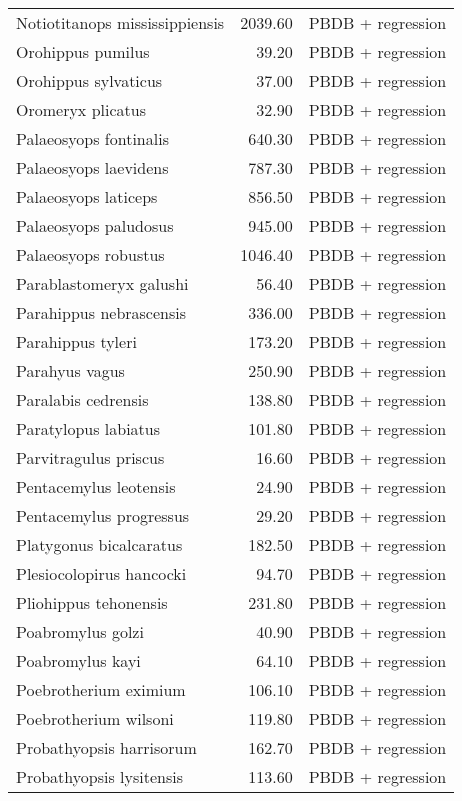 \begin{table}[ht]
\begin{tabular}{lrl}
  Notiotitanops mississippiensis & 2039.60 & PBDB + regression \\ 
  Orohippus pumilus & 39.20 & PBDB + regression \\ 
  Orohippus sylvaticus & 37.00 & PBDB + regression \\ 
  Oromeryx plicatus & 32.90 & PBDB + regression \\ 
  Palaeosyops fontinalis & 640.30 & PBDB + regression \\ 
  Palaeosyops laevidens & 787.30 & PBDB + regression \\ 
  Palaeosyops laticeps & 856.50 & PBDB + regression \\ 
  Palaeosyops paludosus & 945.00 & PBDB + regression \\ 
  Palaeosyops robustus & 1046.40 & PBDB + regression \\ 
  Parablastomeryx galushi & 56.40 & PBDB + regression \\ 
  Parahippus nebrascensis & 336.00 & PBDB + regression \\ 
  Parahippus tyleri & 173.20 & PBDB + regression \\ 
  Parahyus vagus & 250.90 & PBDB + regression \\ 
  Paralabis cedrensis & 138.80 & PBDB + regression \\ 
  Paratylopus labiatus & 101.80 & PBDB + regression \\ 
  Parvitragulus priscus & 16.60 & PBDB + regression \\ 
  Pentacemylus leotensis & 24.90 & PBDB + regression \\ 
  Pentacemylus progressus & 29.20 & PBDB + regression \\ 
  Platygonus bicalcaratus & 182.50 & PBDB + regression \\ 
  Plesiocolopirus hancocki & 94.70 & PBDB + regression \\ 
  Pliohippus tehonensis & 231.80 & PBDB + regression \\ 
  Poabromylus golzi & 40.90 & PBDB + regression \\ 
  Poabromylus kayi & 64.10 & PBDB + regression \\ 
  Poebrotherium eximium & 106.10 & PBDB + regression \\ 
  Poebrotherium wilsoni & 119.80 & PBDB + regression \\ 
  Probathyopsis harrisorum & 162.70 & PBDB + regression \\ 
  Probathyopsis lysitensis & 113.60 & PBDB + regression \\ 

\end{tabular}
\end{table}
